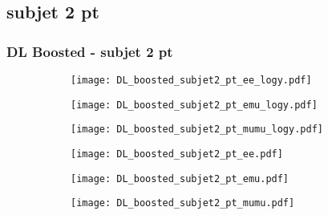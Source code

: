 \documentclass[aspectratio=169,8pt]{beamer}
\begin{document}
\subsection{subjet 2 pt}
\begin{frame}
\frametitle{DL Boosted - subjet 2 pt}
\begin{figure}
\captionsetup[subfigure]{labelformat=empty}
\begin{subfigure}{0.32\textwidth}
\texttt{[image: DL\_boosted\_subjet2\_pt\_ee\_logy.pdf]}
\vspace*{-0.15cm}
\end{subfigure}
\hfil
\begin{subfigure}{0.32\textwidth}
\texttt{[image: DL\_boosted\_subjet2\_pt\_emu\_logy.pdf]}
\vspace*{-0.15cm}
\end{subfigure}
\hfil
\begin{subfigure}{0.32\textwidth}
\texttt{[image: DL\_boosted\_subjet2\_pt\_mumu\_logy.pdf]}
\vspace*{-0.15cm}
\end{subfigure}
\hfil
\begin{subfigure}{0.32\textwidth}
\texttt{[image: DL\_boosted\_subjet2\_pt\_ee.pdf]}
\vspace*{-0.15cm}
\end{subfigure}
\hfil
\begin{subfigure}{0.32\textwidth}
\texttt{[image: DL\_boosted\_subjet2\_pt\_emu.pdf]}
\vspace*{-0.15cm}
\end{subfigure}
\hfil
\begin{subfigure}{0.32\textwidth}
\texttt{[image: DL\_boosted\_subjet2\_pt\_mumu.pdf]}
\vspace*{-0.15cm}
\end{subfigure}
\hfil
\end{figure}
\end{frame}
\newpage
\end{document}
